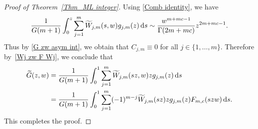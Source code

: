 \begin{proof}[Proof of Theorem~\ref{Thm_ML integer}]
	Using \eqref{Comb identity}, we have
	\begin{gather*}
	\frac{1}{G(m+1)}\int_0^z \sum_{j=1}^{m} 	\widetilde{W}_{j,m}(s,w) g_{j,m}(z)\,{\rm d}s \sim \frac{w^{m+mc-1}}{ \Gamma(2m+mc) } z^{2m+mc-1}.
	\end{gather*}
	Thus by \eqref{G zw asym int}, we obtain that $C_{j,m} \equiv 0$ for all $j \in \{1,\dots, m\}$.
	Therefore by~\eqref{Wj zw F Wj}, we conclude that
	\begin{align*}
		\widetilde{G}(z,w)&= \frac{1}{G(m+1)}\int_0^1 \sum_{j=1}^{m} 	\widetilde{W}_{j,m}(sz,w) z g_{j,m}(z)\,{\rm d}s
		\\
		&= \frac{1}{G(m+1)}\int_0^1 \sum_{j=1}^{m} (-1)^{m-j} 	\widetilde{W}_{j,m}(sz) z g_{j,m}(z)F_{m,c}(szw)\,{\rm d}s.
	\end{align*}
	This completes the proof.
\end{proof}
